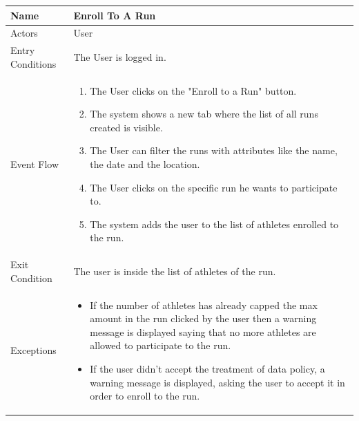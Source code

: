 \begin{enumerate}
\FloatBarrier
\begin{table}[h]
\begin{tabular}{|l|p{}|}
\hline
Name             & Enroll To A Run \\ \hline
Actors           & User  \\ \hline
Entry Conditions & The User is logged in.    \\ \hline
Event Flow       & \begin{enumerate}
            \item The User clicks on the "Enroll to a Run" button.
            \item The system shows a new tab where the list of all runs created is visible.
            \item The User can filter the runs with attributes like the name, the date and the location.
            \item The User clicks on the specific run he wants to participate to.
            \item The system adds the user to the list of athletes enrolled to the run.
        \end{enumerate}\\ \hline
Exit Condition   & The user is inside the list of athletes of the run.\\ \hline
Exceptions       & \begin{itemize}
\item If the number of athletes has already capped the max amount in the run clicked by the user then a warning message is displayed saying that no more athletes are allowed to participate to the run.
\item If the user didn't accept the treatment of data policy, a warning message is displayed, asking the user to accept it in order to enroll to the run.
\end{itemize}\\ \hline
\end{tabular}
\end{table}
\FloatBarrier


\end{enumerate}
